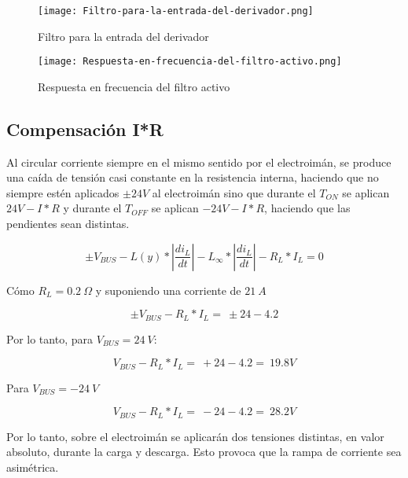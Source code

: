 \begin{figure}[H]
	\centering
	\texttt{[image: Filtro-para-la-entrada-del-derivador.png]}
	\caption{Filtro para la entrada del derivador}
	\label{fig:img_Filtro-para-la-entrada-del-derivador}
\end{figure}

\begin{figure}[H]
	\centering
	\texttt{[image: Respuesta-en-frecuencia-del-filtro-activo.png]}
	\caption{Respuesta en frecuencia del filtro activo}
	\label{fig:img_Respuesta-en-frecuencia-del-filtro-activo}
\end{figure}

\subsection{Compensaci\'{o}n I*R}

\noindent Al circular corriente siempre en el mismo sentido por el electroim\'{a}n, se produce una ca\'{i}da de tensi\'{o}n casi constante en la resistencia interna, haciendo que no siempre est\'{e}n aplicados $\pm 24V$ al electroim\'{a}n sino que durante el $T_{ON}$ se aplican $24V-I*R$ y durante el $T_{OFF}$ se aplican $-24V-I*R$, haciendo que las pendientes sean distintas.

\begin{equation} \label{eq_Vbus-didt-RL}
\pm V_{BUS}-L(y)*\left|\frac{{di}_L}{dt}\right|-L_{\infty }*\left|\frac{{di}_L}{dt}\right|-R_L*I_L=0
\end{equation}

\noindent C\'{o}mo  $R_L=0.2\ \mathit{\Omega}$ y suponiendo una corriente de $21\ A$

\begin{equation} \label{eq_Vbus-didt-RL-2}
\pm V_{BUS}-R_L*I_L=\ \pm 24-4.2
\end{equation}

\noindent Por lo tanto, para $V_{BUS}=24\ V$:

\begin{equation} \label{eq_Vbus-didt-RL-3}
	V_{BUS}-R_L*I_L=\ +24-4.2=\ 19.8V
\end{equation}

\noindent Para $V_{BUS}=-24\ V$

\begin{equation} \label{eq_Vbus-didt-RL-4}
	V_{BUS}-R_L*I_L=\ -24-4.2=\ 28.2V
\end{equation}

\noindent Por lo tanto, sobre el electroim\'{a}n se aplicar\'{a}n dos tensiones distintas, en valor absoluto, durante la carga y descarga. Esto provoca que la rampa de corriente sea asim\'{e}trica.

